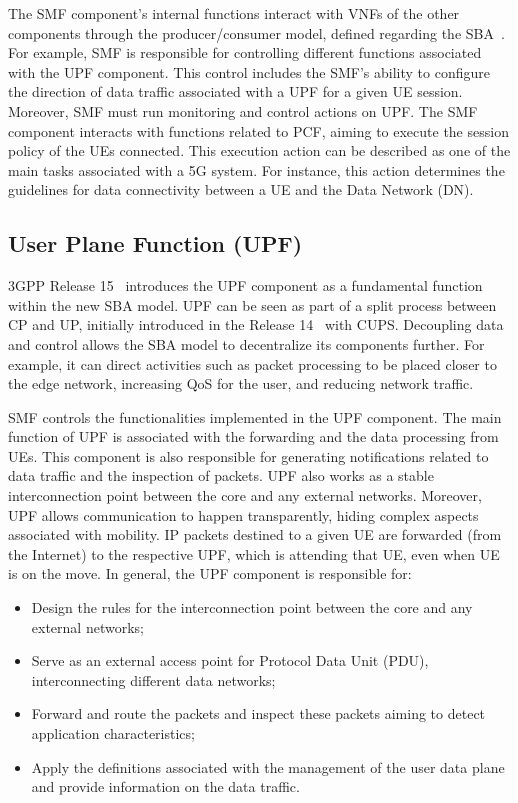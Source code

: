 The SMF component's internal functions interact with VNFs of the other components through the producer/consumer model, defined regarding the SBA~\cite{karnouskos2012SOA}. For example, SMF is responsible for controlling different functions associated with the UPF component. This control includes the SMF's ability to configure the direction of data traffic associated with a UPF for a given UE session. Moreover, SMF must run monitoring and control actions on UPF. The SMF component interacts with functions related to PCF, aiming to execute the session policy of the UEs connected. This execution action can be described as one of the main tasks associated with a 5G system. For instance, this action determines the guidelines for data connectivity between a UE and the Data Network (DN).


\subsection*{User Plane Function (UPF)}

3GPP Release 15~\cite{3gpp:rel15nr21.915} introduces the UPF component as a fundamental function within the new SBA model. UPF can be seen as part of a split process between CP and UP, initially introduced in the Release 14~\cite{3gpp:rel14nr133.185} with CUPS. Decoupling data and control allows the SBA model to decentralize its components further. For example, it can direct activities such as packet processing to be placed closer to the edge network, increasing QoS for the user, and reducing network traffic.


SMF controls the functionalities implemented in the UPF component. The main function of UPF is associated with the forwarding and the data processing from UEs. This component is also responsible for generating notifications related to data traffic and the inspection of packets. UPF also works as a stable interconnection point between the core and any external networks. Moreover, UPF allows communication to happen transparently, hiding complex aspects associated with mobility. IP packets destined to a given UE are forwarded (from the Internet) to the respective UPF, which is attending that UE, even when UE is on the move. In general, the UPF component is responsible for:

\begin{itemize}
  \item Design the rules for the interconnection point between the core and any external networks;
  \item Serve as an external access point for Protocol Data Unit (PDU), interconnecting different data networks;
  \item Forward and route the packets and inspect these packets aiming to detect application characteristics;
  \item Apply the definitions associated with the management of the user data plane and provide information on the data traffic. 
\end{itemize}
 
